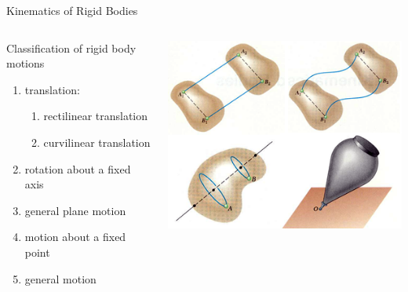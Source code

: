 \documentclass[18pt]{LectMechanics}
\begin{document}
\begin{frame}{Kinematics of Rigid Bodies}{}
	\begin{columns}
		\begin{column}[t]{0.5\linewidth}
			
			\begin{center}
				Classification of rigid body motions
			\end{center}
			\begin{enumerate}
				\item translation:
				      \begin{enumerate}
					      \item rectilinear translation
					      \item curvilinear translation
				      \end{enumerate}
				\item rotation about a fixed axis
				\item general plane motion
				\item motion about a fixed point
				\item general motion
			\end{enumerate}
		\end{column}
		\begin{column}[t]{0.5\linewidth}
			\begin{center}
				\includegraphics[width=\linewidth]{Rigid_body_motion}
			\end{center}
		\end{column}
	\end{columns}
\end{frame}
\end{document}

